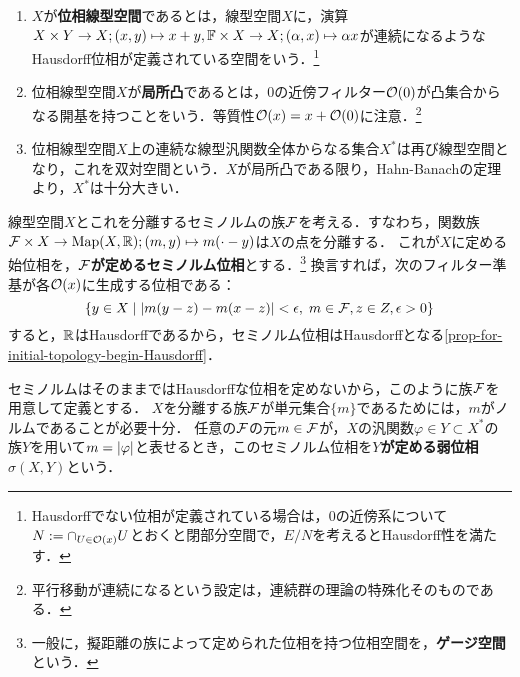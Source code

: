 \documentclass[uplatex,dvipdfmx]{jsreport}
\begin{document}
\begin{definition}\mbox{}
    \begin{enumerate}
        \item $X$が\textbf{位相線型空間}であるとは，線型空間$X$に，演算$X\times Y\to X;(x,y)\mapsto x+y,\mathbb{F}\times X\to X;(\alpha,x)\mapsto\alpha x$が連続になるような
        Hausdorff位相が定義されている空間をいう．\footnote{Hausdorffでない位相が定義されている場合は，$0$の近傍系について$N:=\cap_{U\in\mathcal{O}(x)}U$とおくと閉部分空間で，$E/N$を考えるとHausdorff性を満たす．}
        \item 位相線型空間$X$が\textbf{局所凸}であるとは，$0$の近傍フィルター$\mathcal{O}(0)$が凸集合からなる開基を持つことをいう．等質性$\mathcal{O}(x)=x+\mathcal{O}(0)$に注意．\footnote{平行移動が連続になるという設定は，連続群の理論の特殊化そのものである．}
        \item 位相線型空間$X$上の連続な線型汎関数全体からなる集合$X^*$は再び線型空間となり，これを双対空間という．$X$が局所凸である限り，Hahn-Banachの定理より，$X^*$は十分大きい．
    \end{enumerate}
\end{definition}

\begin{definition}\label{def-seminorm-topology}
    線型空間$X$とこれを分離するセミノルムの族$\mathcal{F}$を考える．すなわち，関数族$\mathcal{F}\times X\to\mathrm{Map}(X,\mathbb{R});(m,y)\mapsto m(\cdot-y)$は$X$の点を分離する．
    これが$X$に定める始位相を，\textbf{$\mathcal{F}$が定めるセミノルム位相}とする．\footnote{一般に，擬距離の族によって定められた位相を持つ位相空間を，\textbf{ゲージ空間}という．}
    換言すれば，次のフィルター準基が各$\mathcal{O}(x)$に生成する位相である：
    \[\left\{y\in X\mid\lvert m(y-z)-m(x-z)\rvert<\epsilon,\;m\in\mathcal{F},z\in Z,\epsilon>0\right\}\]
    すると，$\mathbb{R}$はHausdorffであるから，セミノルム位相はHausdorffとなる\ref{prop-for-initial-topology-begin-Hausdorff}．
\end{definition}
\begin{remarks}
    セミノルムはそのままではHausdorffな位相を定めないから，このように族$\mathcal{F}$を用意して定義とする．
    $X$を分離する族$\mathcal{F}$が単元集合$\{m\}$であるためには，$m$がノルムであることが必要十分．
    任意の$\mathcal{F}$の元$m\in\mathcal{F}$が，$X$の汎関数$\varphi\in Y\subset X^*$の族$Y$を用いて$m=\lvert\varphi\rvert$と表せるとき，このセミノルム位相を\textbf{$Y$が定める弱位相}$\sigma(X,Y)$という．
\end{remarks}
\end{document}
